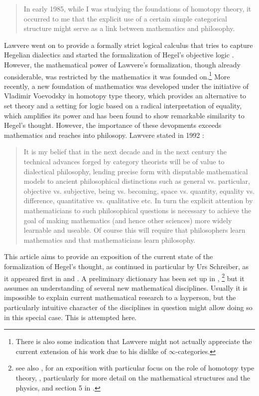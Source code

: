\documentclass{article}
\begin{document}
\begin{quote}
    In early 1985, while I was studying the foundations of homotopy theory, it occurred to me that the
explicit use of a certain simple categorical structure might serve as a link between mathematics and philosophy.

\end{quote}

Lawvere went on to provide a formally strict logical calculus that tries to capture Hegelian dialectics
and started the formalization of Hegel's objective logic \cite{Law91}. However, the mathematical power
of Lawvere's formalization, though already considerable, was restricted by the mathematics it was founded
on.\footnote{There is also some indication that Lawvere might not actually appreciate the current extension
of his work due to his dislike of $\infty$-categories.} More recently, a new foundation of mathematics
was developed under the initiative of Vladimir Voevodsky in homotopy type theory, which provides an alternative
to set theory and a setting for logic based on a radical interpretation of equality, which amplifies its
power and has been found to show remarkable similarity to Hegel's thought. However, the importance of
these devopments exceeds mathematics and reaches into philosopy. Lawvere stated in 1992 \cite{Lawvere92}:


\begin{quote}
It is my belief that in the next decade and in the next century the technical advances forged by category
theorists will be of value to dialectical philosophy, lending precise form with disputable mathematical
models to ancient philosophical distinctions such as general vs. particular, objective vs. subjective,
being vs. becoming, space vs. quantity, equality vs. difference, quantitative vs. qualitative etc. In
turn the explicit attention by mathematicians to such philosophical questions is necessary to achieve
the goal of making mathematics (and hence other sciences) more widely learnable and useable. Of course
this will require that philosophers learn mathematics and that mathematicians learn philosophy.    
\end{quote}

This article aims to provide an exposition of the current state of the formalization of Hegel's thought,
as continued in particular by Urs Schreiber, as it appeared first in \cite{SQuant} and \cite{SSOrb}. A
preliminary dictionary has been set up in \cite{nlabsol}, \footnote{see also \cite{Stalk}, \cite{SSh} for
an exposition with particular focus on the role of homotopy type theory, \cite{dcct}, particularly for
more detail on the mathematical structures and the physics, and section 5 in \cite{Cor}.} but it assumes
an understanding of several new mathematical disciplines. Usually it is impossible to explain current
mathematical research to a layperson, but the particularly intuitive character of the disciplines in question
might allow doing so in this special case. This is attempted here.
\end{document}
